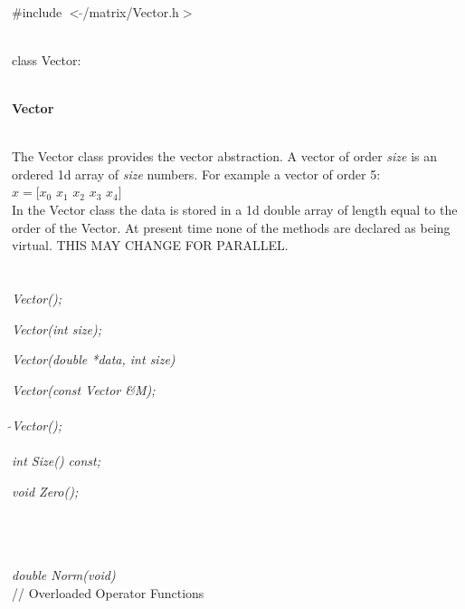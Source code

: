 
   \\
\#include $<\tilde{}$/matrix/Vector.h$>$  


  \\
class Vector:  


 \\
{\bf Vector} 


  \\
\indent The Vector class provides the vector abstraction. A vector of
order {\em size} is an ordered 1d array of {\em size} numbers. For
example a vector of order 5: \\

\indent\indent $ x = [x_0$ $x_1$ $x_2$  $x_3$ $x_4]$ \\


In the Vector class the data is stored in a 1d double array of length
equal to the order of the Vector.  At present time none of the methods
are declared as being virtual. THIS MAY CHANGE FOR PARALLEL. \\

 \\
  \\ 
{\em Vector();}  

{\em  Vector(int size);}  

{\em  Vector(double *data, int size)}  

{\em  Vector(const Vector \&M); }  \\ 

  \\ 
{\em $\tilde{}$Vector();} \\ 

  \\ 
{\em int Size() const;} 

{\em void Zero();} 

 \\ 
 \\ 
 \\  
{\em double Norm(void)} \\ 

{// Overloaded Operator Functions}  

